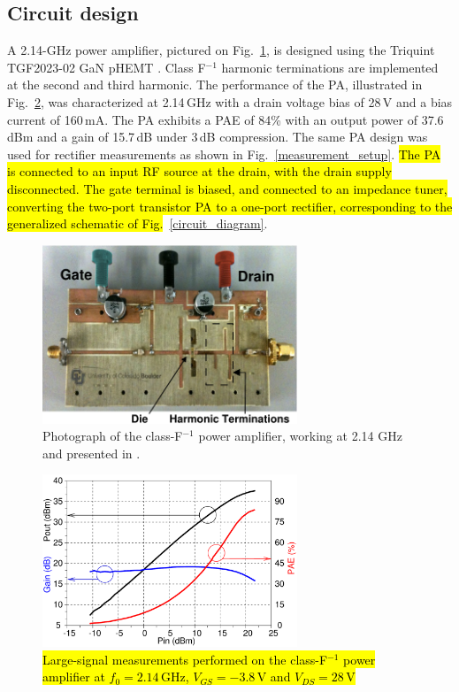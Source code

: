 \documentclass[journal]{IEEEtran}
\begin{document}
\subsection {Circuit design}

A 2.14-GHz power amplifier, pictured on Fig.~\ref{amplifier}, is designed using the Triquint TGF2023-02 GaN pHEMT \cite{gan_pa_letter}. Class F$^{-1}$ harmonic terminations are implemented at the second and third harmonic. The performance of the PA, illustrated in  Fig.~\ref{PA_meas}, was characterized at 2.14\,GHz with a drain voltage bias of 28\,V and a bias current of 160\,mA. The PA exhibits a PAE of 84\% with an output power of 37.6\,dBm and a gain of 15.7\,dB under 3\,dB compression. The same PA design was used for rectifier measurements as shown in Fig.~\ref{measurement_setup}. \hl{The PA is connected to an input RF source at the drain, with the drain supply disconnected. The gate terminal is biased, and connected to an impedance tuner, converting the two-port transistor PA to a one-port rectifier, corresponding to the generalized schematic of Fig.}~\ref{circuit_diagram}.

\begin{figure}[ht!]
\centering
\includegraphics[width=3.0in]{pdf/08.pdf}
\caption{Photograph of the class-F$^{-1}$ power amplifier, working at 2.14 GHz and presented in \cite{gan_pa_letter}.}
\label{amplifier}
\end{figure}


\begin{figure}
  \begin{center}
  \includegraphics[width=3.0in]{pdf/09.pdf}
  \caption{\hl{Large-signal measurements performed on the class-F$^{-1}$ power amplifier at $f_0=2.14$\,GHz, $V_{GS}=-3.8$\,V and $V_{DS}=28$\,V}}
\label{PA_meas}
  \end{center}
\end{figure}
\end{document}
